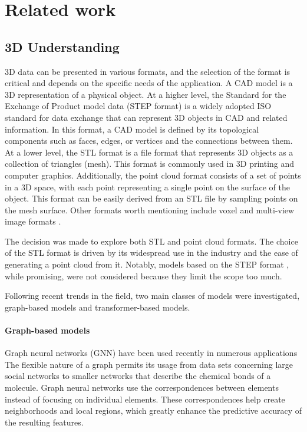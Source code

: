 \chapter{Related work}
\label{chap:related_work}

\section{3D Understanding}

3D data can be presented in various formats, and the selection of the format is critical and depends on the specific needs of the application. A CAD model is a 3D representation of a physical object. At a higher level, the Standard for the Exchange of Product model data (STEP format) is a widely adopted ISO standard for data exchange that can represent 3D objects in CAD and related information. In this format, a CAD model is defined by its topological components such as faces, edges, or vertices and the connections between them. At a lower level, the STL format is a file format that represents 3D objects as a collection of triangles (mesh). This format is commonly used in 3D printing and computer graphics. Additionally, the point cloud format consists of a set of points in a 3D space, with each point representing a single point on the surface of the object. This format can be easily derived from an STL file by sampling points on the mesh surface. Other formats worth mentioning include voxel and multi-view image formats \cite{zhangDeepLearningbased3D2023}.

The decision was made to explore both STL and point cloud formats. The choice of the STL format is driven by its widespread use in the industry and the ease of generating a point cloud from it. Notably, models based on the STEP format \cite{mandelliCAD3DModel2022}, while promising, were not considered because they limit the scope too much.

Following recent trends in the field, two main classes of models were investigated, graph-based models and transformer-based models.

\subsubsection{Graph-based models}

Graph neural networks (GNN) have been used recently in numerous applications \cite{wuComprehensiveSurveyGraph2021,jumperHighlyAccurateProtein2021}
The flexible nature of a graph permits its usage from data sets concerning large social networks to smaller networks that describe the chemical bonds of a molecule. Graph neural networks use the correspondences between elements instead of focusing on individual elements. These correspondences help create neighborhoods and local regions, which greatly enhance the predictive accuracy of the resulting features.

